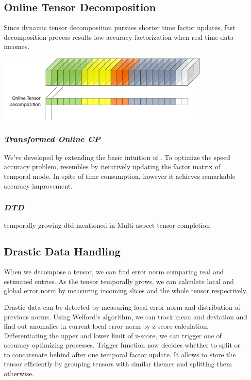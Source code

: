 
\subsection{Online Tensor Decomposition}
Since dynamic tensor decomposition pursues shorter time factor updates, fast decomposition process results low accuracy factorization when real-time data incomes.

\begin{center}
	\includegraphics[width=0.8\textwidth]{FIG/0-online-tensor-decomposition.pdf}
\end{center}

\subsubsection{\em Transformed Online CP}
We've developed \tocp by extending the basic intuition of \ocp. To optimize the speed accuracy problem, \tocp resembles \cpals by iteratively updating the factor matrix of temporal mode. In spite of time consumption, however it achieves remarkable accuracy improvement.

\subsubsection{\em DTD}
temporally growing dtd mentioned in Multi-aspect tensor completion

\newpage
\subsection{Drastic Data Handling}
When we decompose a tensor, we can find error norm comparing real and estimated entries. As the tensor temporally grows, we can calculate local and global error norm by measuring incoming slices and the whole tensor respectively.

Drastic data can be detected by measuring local error norm and distribution of previous norms. Using Welford's algorithm, we can track mean and deviation and find out anomalies in current local error norm by z-score calculation. Differentiating the upper and lower limit of z-score, we can trigger one of accuracy optimizing processes. Trigger function now decides whether to split or to concatenate behind after one temporal factor update. It allows to store the tensor efficiently by grouping tensors with similar themes and splitting them otherwise.


